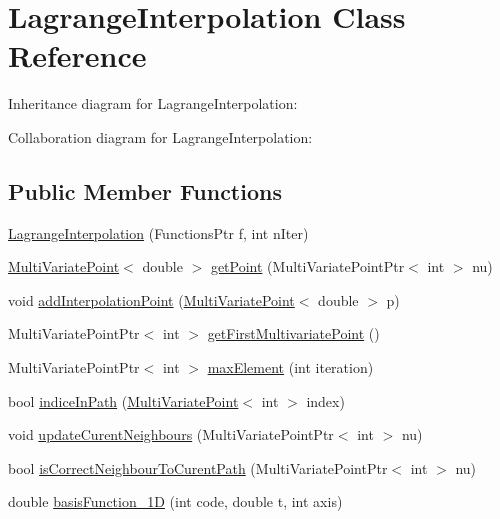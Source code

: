 \hypertarget{class_lagrange_interpolation}{}\section{Lagrange\+Interpolation Class Reference}
\label{class_lagrange_interpolation}


Inheritance diagram for Lagrange\+Interpolation\+:


Collaboration diagram for Lagrange\+Interpolation\+:
\subsection*{Public Member Functions}
\begin{DoxyCompactItemize}
\item 
\hyperlink{class_lagrange_interpolation_a706178734a56c65a34c3437fa90aadd5}{Lagrange\+Interpolation} (Functions\+Ptr f, int n\+Iter)
\item 
\hyperlink{class_multi_variate_point}{Multi\+Variate\+Point}$<$ double $>$ \hyperlink{class_lagrange_interpolation_a37a0077fbf7dfa02811e4012cea87f05}{get\+Point} (Multi\+Variate\+Point\+Ptr$<$ int $>$ nu)
\item 
void \hyperlink{class_lagrange_interpolation_ae821197c9a472d99e9b7635db24fbf2b}{add\+Interpolation\+Point} (\hyperlink{class_multi_variate_point}{Multi\+Variate\+Point}$<$ double $>$ p)
\item 
Multi\+Variate\+Point\+Ptr$<$ int $>$ \hyperlink{class_lagrange_interpolation_a6d491cb766b505eee8d65038a6ff6e02}{get\+First\+Multivariate\+Point} ()
\item 
Multi\+Variate\+Point\+Ptr$<$ int $>$ \hyperlink{class_lagrange_interpolation_ac4c9a2d839db489c85ac8818b4abc777}{max\+Element} (int iteration)
\item 
bool \hyperlink{class_lagrange_interpolation_a4e86ab1204fa39cd83b6de4bba621203}{indice\+In\+Path} (\hyperlink{class_multi_variate_point}{Multi\+Variate\+Point}$<$ int $>$ index)
\item 
void \hyperlink{class_lagrange_interpolation_a1e263cf7d5f4ac2272e589a563a53223}{update\+Curent\+Neighbours} (Multi\+Variate\+Point\+Ptr$<$ int $>$ nu)
\item 
bool \hyperlink{class_lagrange_interpolation_ab964d7da47797afd51edf7c82365a17b}{is\+Correct\+Neighbour\+To\+Curent\+Path} (Multi\+Variate\+Point\+Ptr$<$ int $>$ nu)
\item 
double \hyperlink{class_lagrange_interpolation_a138b1d9afd24ab2e21e8c01dac82880c}{basis\+Function\+\_\+1D} (int code, double t, int axis)
\end{DoxyCompactItemize}
